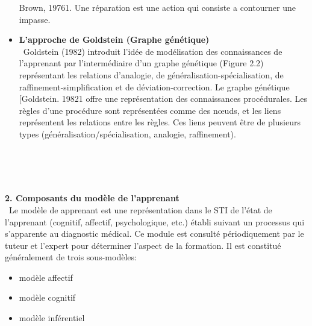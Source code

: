 \begin{itemize}
Brown, 19761. Une réparation est une action qui consiste a contourner une impasse.
\item \textbf{L'approche de Goldstein (Graphe génétique)} \\\
Goldstein (1982) introduit l'idée de modélisation des connaissances de l'apprenant par
l'intermédiaire d'un graphe génétique (Figure 2.2) représentant les relations d'analogie, de
généralisation-spécialisation, de raffinement-simplification et de déviation-correction.
Le graphe génétique [Goldstein. 19821 offre une représentation des connaissances
procédurales. Les règles d'une procédure sont représentées comme des nœuds, et les liens
représentent les relations entre les règles. Ces liens peuvent être de plusieurs types (généralisation/spécialisation, analogie, raffinement).\\\

\end{itemize}
\\\ 

\textbf{2. Composants du modèle de l'apprenant} \\\
Le modèle de apprenant est une représentation dans le STI de l'état de l'apprenant (cognitif, affectif, psychologique, etc.) établi suivant un processus qui
s'apparente au diagnostic médical. Ce module est consulté périodiquement par le
tuteur et l'expert pour déterminer l'aspect de la formation.
 Il est constitué généralement de trois sous-modèles:
 \begin{itemize}
     \item modèle affectif
    \item modèle cognitif
    \item modèle inférentiel 
\end{itemize}


